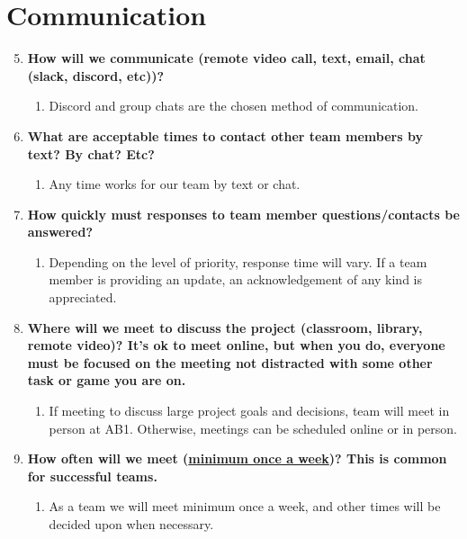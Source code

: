 \documentclass[12pt]{article}
\begin{document}
\section{Communication}

\begin{enumerate}
    \setcounter{enumi}{4}
    \item \textbf{How will we communicate (remote video call, text, email, chat (slack, discord, etc))?}
    \begin{enumerate}
        \item Discord and group chats are the chosen method of communication.
    \end{enumerate}

    \item \textbf{What are acceptable times to contact other team members by text? By chat? Etc?}
    \begin{enumerate}
        \item Any time works for our team by text or chat.
    \end{enumerate}

    \item \textbf{How quickly must responses to team member questions/contacts be answered?}
    \begin{enumerate}
        \item Depending on the level of priority, response time will vary. If a team member is providing an update, an acknowledgement of any kind is appreciated.
    \end{enumerate}

    \item \textbf{Where will we meet to discuss the project (classroom, library, remote video)? It's ok to meet online, but when you do, everyone must be focused on the meeting not distracted with some other task or game you are on.}
    \begin{enumerate}
        \item If meeting to discuss large project goals and decisions, team will meet in person at AB1. Otherwise, meetings can be scheduled online or in person.
    \end{enumerate}

    \item \textbf{How often will we meet (\underline{minimum once a week})? This is common for successful teams.}
    \begin{enumerate}
        \item As a team we will meet minimum once a week, and other times will be decided upon when necessary.
    \end{enumerate}


\end{enumerate}
\end{document}

